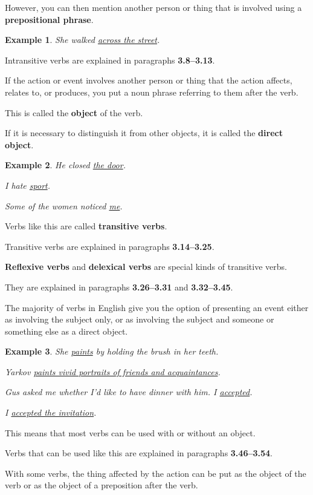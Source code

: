 \documentclass[oneside]{book}
\numberwithin{equation}{section}
\newtheorem{example}{Example}[section]
\begin{document}
%
However, you can then mention another person or thing that is involved using a \textbf{prepositional phrase}.
\begin{example}
    She walked \underline{across the street}.
\end{example}
Intransitive verbs are explained in paragraphs \textbf{3.8--3.13}.

%
\noindent{} If the action or event involves another person or thing that the action affects, relates to, or produces, you put a noun phrase referring to them after the verb.

This is called the \textbf{object} of the verb.

If it is necessary to distinguish it from other objects, it is called the \textbf{direct object}.
\begin{example}
    He closed \underline{the door}.
    
    I hate \underline{sport}.
    
    Some of the women noticed \underline{me}.
\end{example}
Verbs like this are called \textbf{transitive verbs}.

Transitive verbs are explained in paragraphs \textbf{3.14--3.25}.

%
\textbf{Reflexive verbs} and \textbf{delexical verbs} are special kinds of transitive verbs.

They are explained in paragraphs \textbf{3.26--3.31} and \textbf{3.32--3.45}.

%
\noindent{} The majority of verbs in English give you the option of presenting an event either as involving the subject only, or as involving the subject and someone or something else as a direct object.
\begin{example}
    She \underline{paints} by holding the brush in her teeth.
    
    Yarkov \underline{paints vivid portraits of friends and acquaintances}.
    
    Gus asked me whether I'd like to have dinner with him. I \underline{accepted}.
    
    I \underline{accepted the invitation}.
\end{example}
This means that most verbs can be used with or without an object.

Verbs that can be used like this are explained in paragraphs \textbf{3.46--3.54}.

%
With some verbs, the thing affected by the action can be put as the object of the verb or as the object of a preposition after the verb.
\end{document}

